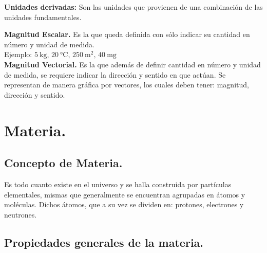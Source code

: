 \documentclass[14pt]{extarticle}
\begin{document}
\textbf{Unidades derivadas: } Son las unidades que provienen de una combinación de las unidades fundamentales.

\textbf{Magnitud Escalar.} Es la que queda definida con sólo indicar su cantidad en número y unidad de medida.
\\
Ejemplo: $\SI{5}{\kilo\gram},\, \SI{20}{\degreeCelsius}, \, \SI{250}{\square\metre}, \, \SI{40}{\milli\gram}$
\\
\textbf{Magnitud Vectorial.} Es la que además de definir cantidad en número y unidad de medida, se requiere indicar la dirección y sentido en que actúan. Se representan de manera gráfica por vectores, los cuales deben tener: magnitud, dirección y sentido.

\section{Materia.}

\subsection{Concepto de Materia.}

Es todo cuanto existe en el universo y se halla construida por partículas elementales, mismas que
generalmente se encuentran agrupadas en átomos y moléculas. Dichos átomos, que a su vez se dividen en: protones, electrones y neutrones.

\subsection{Propiedades generales de la materia.}
\end{document}
